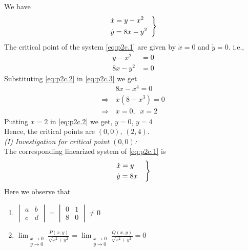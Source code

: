 \documentclass[../main-sheet.tex]{subfiles}
\begin{document}
\begin{soln}[c]
    We have
    \begin{equation}
        \begin{rcases}
            \displaystyle\dot{x}=y-x^2\quad\\
            \displaystyle\dot{y}=8x-y^2
        \end{rcases}
        \label{eq:p2c.1}
    \end{equation}
    The critical point of the system \eqref{eq:p2c.1} are given by \(\dot{x}=0\) and \(\dot{y}=0\). i.e.,
    \begin{align}
        y-x^2&=0\label{eq:p2c.2}\\
        8x-y^2&=0\label{eq:p2c.3}
    \end{align}
    Substituting \eqref{eq:p2c.2} in \eqref{eq:p2c.3} we get
    \begin{align*}
        &8x-x^4=0\\
        \Rightarrow\,&x(8-x^3)=0\\
        \Rightarrow\,&x=0,\;\;x=2
    \end{align*}
    Putting \(x=2\) in \eqref{eq:p2c.2} we get, \(y=0\), \(y=4\)\\


    Hence, the critical points are \((0,0)\), \((2,4)\).\\
    
    
    \emph{(I) Investigation for critical point \((0,0)\):}\\
    The corresponding linearized system of \eqref{eq:p2c.1} is 
    \begin{equation}
        \begin{rcases}
            \dot{x}=y\\
            \dot{y}=8x\quad
        \end{rcases}
        \label{eq:p2c.4}
    \end{equation}
    Here we observe that
    \begin{enumerate}[label=(\roman*)]
        \item \(\begin{vmatrix}
            a&b\\
            c&d
        \end{vmatrix}=\begin{vmatrix}
            0&1\\
            8&0
        \end{vmatrix}\neq 0\)
        \item \(\displaystyle\lim_{\substack{x\to 0 \\ y\to 0}} \frac{P(x,y)}{\sqrt{x^2+y^2}}=\lim_{\substack{x\to 0 \\ y\to 0}} \frac{Q(x,y)}{\sqrt{x^2+y^2}}=0\)\\ 
        

\end{enumerate}
\end{soln}
\end{document}
